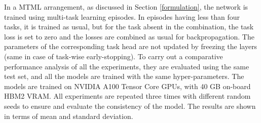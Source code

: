 \documentclass[conference]{IEEEtran}
\begin{document}
In a \ac{MTML} arrangement, as discussed in Section \ref{formulation}, the network is trained using multi-task learning episodes. 
In episodes having less than four tasks, it is trained as usual, but for the task absent in the combination, the task loss is set to zero and the losses are combined as usual for backpropagation. The parameters of the corresponding task head are not updated by freezing the layers (same in case of task-wise early-stopping). 
To carry out a comparative performance analysis of all the experiments, they are evaluated using the same test set, and all the models are trained with the same hyper-parameters.
The models are trained on NVIDIA A100 Tensor Core GPUs, with 40 GB on-board HBM2 VRAM.
All experiments are repeated three times with different random seeds to ensure and evaluate the consistency of the model.
The results are shown in terms of mean and standard deviation.
\end{document}
